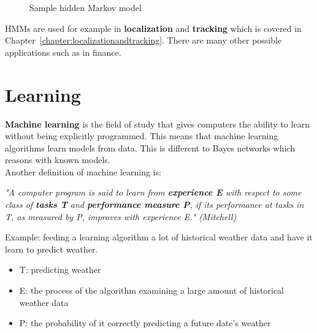 \documentclass{report}
\begin{document}
\begin{figure}[h!]
\centering
{}
\caption{Sample hidden Markov model}
\label{fig:samplehiddenmarkov}
\end{figure}


HMMs are used for example in {\bf localization} and {\bf tracking} which is covered in Chapter~\ref{chapter:localizationandtracking}. There are many other possible applications such as in finance.


\chapter{Learning}

{\bf Machine learning} is the field of study that gives computers the ability to learn without being explicitly programmed.
This means that machine learning algorithms learn models from data.
This is different to Bayes networks which reasons with known models.
\\
Another definition of machine learning is:
\begin{flushright}
{\em "A computer program is said to learn from {\bf experience E} with respect to some class of {\bf tasks T} and {\bf performance measure P}, if its performance at tasks in T, as measured by P, improves with experience E." (Mitchell)}
\end{flushright}

Example: feeding a learning algorithm a lot of historical weather data and have it learn to predict weather.
\begin{itemize}
\item T: predicting weather
\item E: the process of the algorithm examining a large amount of historical weather data
\item P: the probability of it correctly predicting a future date's weather
\end{itemize}
\end{document}
